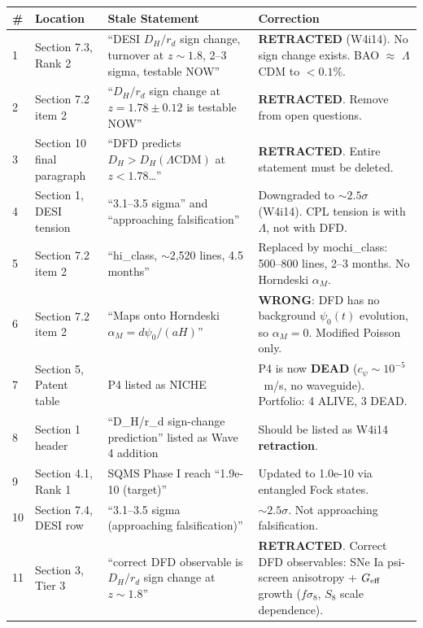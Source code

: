 \documentclass[11pt]{article}
\newcommand{\LCDM}{$\Lambda$CDM}
\newcommand{\Geff}{G_{\rm eff}}
\begin{document}
\begin{longtable}{p{0.6cm}p{3cm}p{4cm}p{5cm}}
\toprule
\textbf{\#} & \textbf{Location} & \textbf{Stale Statement} & \textbf{Correction} \\
\midrule
\endhead

1 & Section 7.3, Rank 2 & ``DESI $D_H/r_d$ sign change, turnover at $z \sim 1.8$, 2--3 sigma, testable NOW'' & \textbf{RETRACTED} (W4i14). No sign change exists. BAO $\approx$ \LCDM{} to $<0.1\%$. \\

2 & Section 7.2 item 2 & ``$D_H/r_d$ sign change at $z = 1.78 \pm 0.12$ is testable NOW'' & \textbf{RETRACTED}. Remove from open questions. \\

3 & Section 10 final paragraph & ``DFD predicts $D_H > D_H(\Lambda\text{CDM})$ at $z < 1.78$\ldots'' & \textbf{RETRACTED}. Entire statement must be deleted. \\

4 & Section 1, DESI tension & ``3.1--3.5 sigma'' and ``approaching falsification'' & Downgraded to $\sim 2.5\sigma$ (W4i14). CPL tension is with $\Lambda$, not with DFD. \\

5 & Section 7.2 item 2 & ``hi\_class, $\sim$2,520 lines, 4.5 months'' & Replaced by mochi\_class: 500--800 lines, 2--3 months. No Horndeski $\alpha_M$. \\

6 & Section 7.2 item 2 & ``Maps onto Horndeski $\alpha_M = d\psi_0/(aH)$'' & \textbf{WRONG}: DFD has no background $\psi_0(t)$ evolution, so $\alpha_M = 0$. Modified Poisson only. \\

7 & Section 5, Patent table & P4 listed as NICHE & P4 is now \textbf{DEAD} ($c_\psi \sim 10^{-5}$~m/s, no waveguide). Portfolio: 4 ALIVE, 3 DEAD. \\

8 & Section 1 header & ``D\_H/r\_d sign-change prediction'' listed as Wave 4 addition & Should be listed as W4i14 \textbf{retraction}. \\

9 & Section 4.1, Rank 1 & SQMS Phase I reach ``1.9e-10 (target)'' & Updated to 1.0e-10 via entangled Fock states. \\

10 & Section 7.4, DESI row & ``3.1--3.5 sigma (approaching falsification)'' & $\sim 2.5\sigma$. Not approaching falsification. \\

11 & Section 3, Tier 3 & ``correct DFD observable is $D_H/r_d$ sign change at $z \sim 1.8$'' & \textbf{RETRACTED}. Correct DFD observables: SNe Ia psi-screen anisotropy + $\Geff$ growth ($f\sigma_8$, $S_8$ scale dependence). \\

\bottomrule
\end{longtable}
\end{document}
